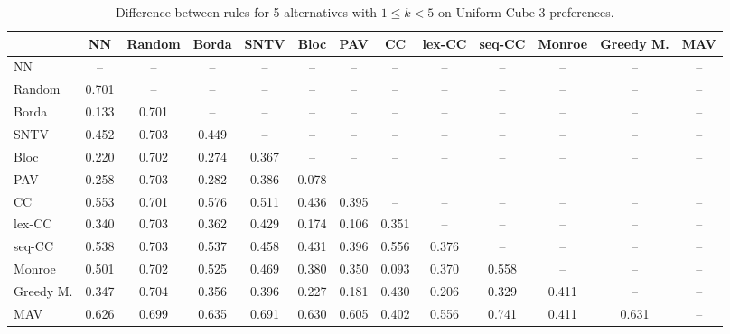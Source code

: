 
\begin{table*}[h!]
\centering
\begin{tabular}{lcccccccccccc}
\toprule
 & NN & Random & Borda & SNTV & Bloc & PAV & CC & lex-CC & seq-CC & Monroe & Greedy M. & MAV \\
\midrule
NN & -- & -- & -- & -- & -- & -- & -- & -- & -- & -- & -- & -- \\
Random & 0.701 & -- & -- & -- & -- & -- & -- & -- & -- & -- & -- & -- \\
Borda & 0.133 & 0.701 & -- & -- & -- & -- & -- & -- & -- & -- & -- & -- \\
SNTV & 0.452 & 0.703 & 0.449 & -- & -- & -- & -- & -- & -- & -- & -- & -- \\
Bloc & 0.220 & 0.702 & 0.274 & 0.367 & -- & -- & -- & -- & -- & -- & -- & -- \\
PAV & 0.258 & 0.703 & 0.282 & 0.386 & 0.078 & -- & -- & -- & -- & -- & -- & -- \\
CC & 0.553 & 0.701 & 0.576 & 0.511 & 0.436 & 0.395 & -- & -- & -- & -- & -- & -- \\
lex-CC & 0.340 & 0.703 & 0.362 & 0.429 & 0.174 & 0.106 & 0.351 & -- & -- & -- & -- & -- \\
seq-CC & 0.538 & 0.703 & 0.537 & 0.458 & 0.431 & 0.396 & 0.556 & 0.376 & -- & -- & -- & -- \\
Monroe & 0.501 & 0.702 & 0.525 & 0.469 & 0.380 & 0.350 & 0.093 & 0.370 & 0.558 & -- & -- & -- \\
Greedy M. & 0.347 & 0.704 & 0.356 & 0.396 & 0.227 & 0.181 & 0.430 & 0.206 & 0.329 & 0.411 & -- & -- \\
MAV & 0.626 & 0.699 & 0.635 & 0.691 & 0.630 & 0.605 & 0.402 & 0.556 & 0.741 & 0.411 & 0.631 & -- \\
\bottomrule
\end{tabular}

\caption{Difference between rules for 5 alternatives with $1 \leq k < 5$ on Uniform Cube 3 preferences.}
\end{table*}
